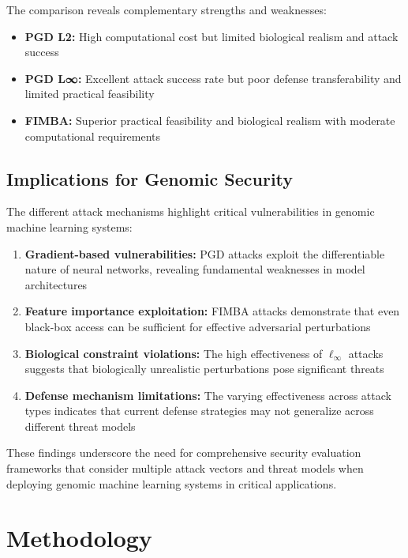 \documentclass{article} %
\begin{document}
The comparison reveals complementary strengths and weaknesses:

\begin{itemize}
    \item \textbf{PGD L2:} High computational cost but limited biological realism and attack success
    \item \textbf{PGD L∞:} Excellent attack success rate but poor defense transferability and limited practical feasibility
    \item \textbf{FIMBA:} Superior practical feasibility and biological realism with moderate computational requirements
\end{itemize}

\subsection{Implications for Genomic Security}

The different attack mechanisms highlight critical vulnerabilities in genomic machine learning systems:

\begin{enumerate}
    \item \textbf{Gradient-based vulnerabilities:} PGD attacks exploit the differentiable nature of neural networks, revealing fundamental weaknesses in model architectures
    \item \textbf{Feature importance exploitation:} FIMBA attacks demonstrate that even black-box access can be sufficient for effective adversarial perturbations
    \item \textbf{Biological constraint violations:} The high effectiveness of $\ell_\infty$ attacks suggests that biologically unrealistic perturbations pose significant threats
    \item \textbf{Defense mechanism limitations:} The varying effectiveness across attack types indicates that current defense strategies may not generalize across different threat models
\end{enumerate}

These findings underscore the need for comprehensive security evaluation frameworks that consider multiple attack vectors and threat models when deploying genomic machine learning systems in critical applications.

\section{Methodology}
\end{document}
